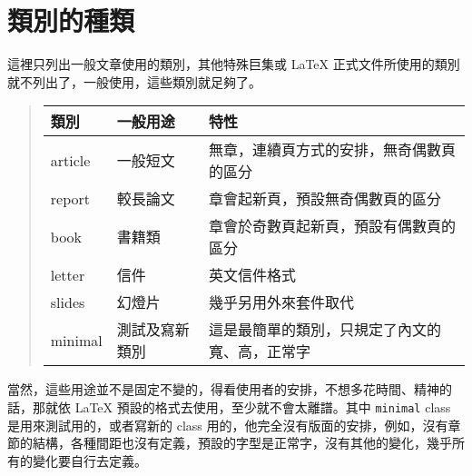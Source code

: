 \section{類別的種類}

這裡只列出一般文章使用的類別，其他特殊巨集或 \LaTeX{} 正式文件所使用的類別就不列出了，一般使用，這些類別就足夠了。

\begin{quote}
   \begin{tabular}{>{\ttfamily }lll}
      類別    & 一般用途       & 特性                                           \\
      \hline
      article & 一般短文       & 無章，連續頁方式的安排，無奇偶數頁的區分       \\
      report  & 較長論文       & 章會起新頁，預設無奇偶數頁的區分               \\
      book    & 書籍類         & 章會於奇數頁起新頁，預設有偶數頁的區分         \\
      letter  & 信件           & 英文信件格式                                   \\
      slides  & 幻燈片         & 幾乎另用外來套件取代                           \\
      minimal & 測試及寫新類別 & 這是最簡單的類別，只規定了內文的寬、高，正常字
   \end{tabular}
\end{quote}
%
%

當然，這些用途並不是固定不變的，得看使用者的安排，不想多花時間、精神的話，那就依 \LaTeX{} 預設的格式去使用，至少就不會太離譜。其中 \texttt{minimal} class 是用來測試用的，或者寫新的 class 用的，他完全沒有版面的安排，例如，沒有章節的結構，各種間距也沒有定義，預設的字型是正常字，沒有其他的變化，幾乎所有的變化要自行去定義。
